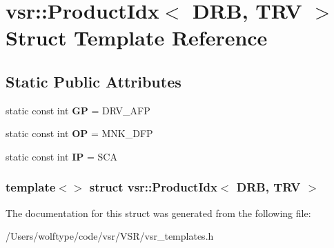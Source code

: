 \hypertarget{structvsr_1_1_product_idx_3_01_d_r_b_00_01_t_r_v_01_4}{\section{vsr\-:\-:Product\-Idx$<$ D\-R\-B, T\-R\-V $>$ Struct Template Reference}
\label{structvsr_1_1_product_idx_3_01_d_r_b_00_01_t_r_v_01_4}
}
\subsection*{Static Public Attributes}
\begin{DoxyCompactItemize}
\item 
\hypertarget{structvsr_1_1_product_idx_3_01_d_r_b_00_01_t_r_v_01_4_a20a728c1cef7b37cd551d6899bd4f78b}{static const int {\bfseries G\-P} = D\-R\-V\-\_\-\-A\-F\-P}\label{structvsr_1_1_product_idx_3_01_d_r_b_00_01_t_r_v_01_4_a20a728c1cef7b37cd551d6899bd4f78b}

\item 
\hypertarget{structvsr_1_1_product_idx_3_01_d_r_b_00_01_t_r_v_01_4_a6a5bdc58548d593b8bdaad1f0ed381cc}{static const int {\bfseries O\-P} = M\-N\-K\-\_\-\-D\-F\-P}\label{structvsr_1_1_product_idx_3_01_d_r_b_00_01_t_r_v_01_4_a6a5bdc58548d593b8bdaad1f0ed381cc}

\item 
\hypertarget{structvsr_1_1_product_idx_3_01_d_r_b_00_01_t_r_v_01_4_a620fcefcad0cde7eadaf0ac81ad6d48c}{static const int {\bfseries I\-P} = S\-C\-A}\label{structvsr_1_1_product_idx_3_01_d_r_b_00_01_t_r_v_01_4_a620fcefcad0cde7eadaf0ac81ad6d48c}

\end{DoxyCompactItemize}
\subsubsection*{template$<$$>$ struct vsr\-::\-Product\-Idx$<$ D\-R\-B, T\-R\-V $>$}



The documentation for this struct was generated from the following file\-:\begin{DoxyCompactItemize}
\item 
/\-Users/wolftype/code/vsr/\-V\-S\-R/vsr\-\_\-templates.\-h\end{DoxyCompactItemize}
